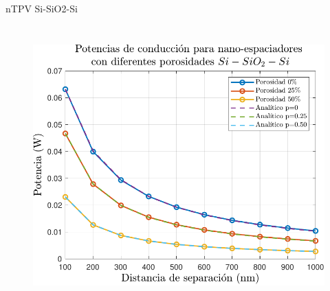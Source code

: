 \documentclass[spanish,a4paper]{beamer}%
\begin{document}
\begin{frame}{nTPV Si-SiO2-Si}
{\begin{columns}
			\begin{figure}[t]
				\centering
					\includegraphics[width=1.00\columnwidth]{Ppor_SiSiO2Si}
				\label{fig:Ppor_SiSiO2Si}
			\end{figure}
			

\end{columns}}
\end{frame}
\end{document}
